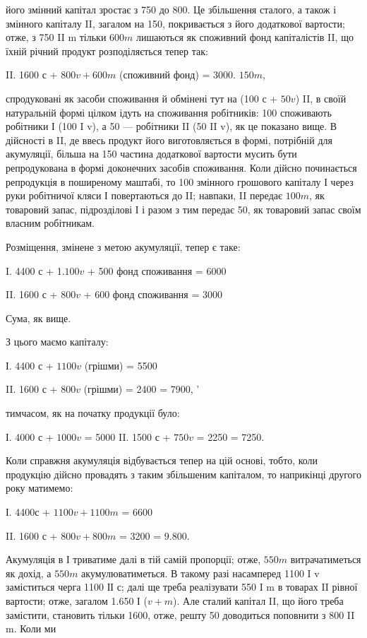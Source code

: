 \parcont{}  %
його змінний капітал зростає з 750 до 800. Це збільшення сталого, а
також і змінного капіталу II, загалом на 150, покривається з його додаткової
вартости; отже, з 750 II m тільки $600 m$ лишаються як споживний
фонд капіталістів II, що їхній річний продукт розподіляється тепер
так:

II. 1600 с + $800 v + 600m$ (споживний фонд) = 3000.    $150 m$,

спродуковані як засоби споживання й обмінені тут на (100 с + $50 v$) II,
в своїй натуральній формі цілком ідуть на споживання робітників: 100
споживають робітники І (100 I v), а 50 — робітники II (50 II v), як це
показано вище. В дійсності в II, де ввесь продукт його виготовляється
в формі, потрібній для акумуляції, більша на 150 частина додаткової
вартости мусить бути репродукована в формі доконечних засобів
споживання. Коли дійсно починається репродукція в поширеному
маштабі, то 100 змінного грошового капіталу І через руки робітничої
кляси І повертаються до II; навпаки, II передає $100 m$, як товаровий
запас, підрозділові І і разом з тим передає 50, як товаровий запас своїм
власним робітникам.

Розміщення, змінене з метою акумуляції, тепер є таке:

I.    4400 с + 1.$100 v$ + 500 фонд споживання = 6000

II.    1600 с + $800 v$ + 600 фонд споживання = 3000

Сума, як вище.

З цього маємо капіталу:

І. 4400 с + $1100 v$ (грішми) = 5500

II. 1600 с + $800 v$ (грішми) = 2400
= 7900, ’

тимчасом, як на початку продукції було:

І. 4000 с + $1000 v$ = 5000
II. 1500 с + $750 v$ = 2250
= 7250.

Коли справжня акумуляція відбувається тепер на цій основі, тобто,
коли продукцію дійсно провадять з таким збільшеним капіталом, то
наприкінці другого року матимемо:

І. 4400с + $1100 v + 1100 m$ = 6600

II. 1600 с + $800 v + 800 m$ = 3200
= 9.800.

Акумуляція в І триватиме далі в тій самій пропорції; отже, $550 m$
витрачатиметься як дохід, а $550 m$ акумулюватиметься. В такому разі насамперед
1100 I v заміститься черга 1100 ІІ с; далі ще треба реалізувати
550 I m в товарах II рівної вартости; отже, загалом 1.650 І
($v + m$). Але сталий капітал II, що його треба замістити, становить
тільки 1600, отже, решту 50 доводиться поповнити з 800 II m. Коли ми
\parbreak{}  %
